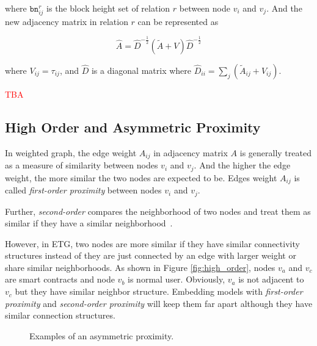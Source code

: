 where $\texttt{bn}_{ij}^{r}$ is the block height set of relation $r$ between node $v_i$ and $v_j$. And the new adjacency matrix in relation $r$ can be represented as 

\begin{equation}
\hat{A}=\hat{D}^{-\frac{1}{2}}(\tilde{A}+V)\hat{D}^{-\frac{1}{2}}
\label{eq:?}
\end{equation}

where $V_{ij}=\tau_{ij}$, and $\hat{D}$ is a diagonal matrix where $\hat{D}_{ii}=\sum_{j}(\tilde{A}_{ij}+V_{ij})$.

\textcolor{red}{TBA}

\subsection{High Order and Asymmetric Proximity}
In weighted graph, the edge weight $A_{ij}$ in adjacency matrix $A$ is generally treated as a measure of similarity between nodes $v_i$ and $v_j$. And the higher the edge weight, the more similar the two nodes are expected to be. Edges weight $A_{ij}$ is called \emph{first-order proximity} between nodes $v_i$ and $v_j$. 

Further, \emph{second-order} compares the neighborhood of two nodes and treat them as similar if they have a similar neighborhood~\cite{goyal2018graph}. 

However, in ETG, two nodes are more similar if they have similar connectivity structures instead of they are just connected by an edge with larger weight or share similar neighborhoods. As shown in Figure \ref{fig:high_order}, nodes $v_a$ and $v_c$ are smart contracts and node $v_b$ is normal user. Obviously, $v_a$ is not adjacent to $v_c$  but they have similar neighbor structure. Embedding models with \emph{first-order proximity} and \emph{second-order proximity} will keep them far apart although they have similar connection structures. 

\begin{figure}[htbp]
	\centering
	\caption{Examples of an asymmetric proximity.}

\end{figure}

